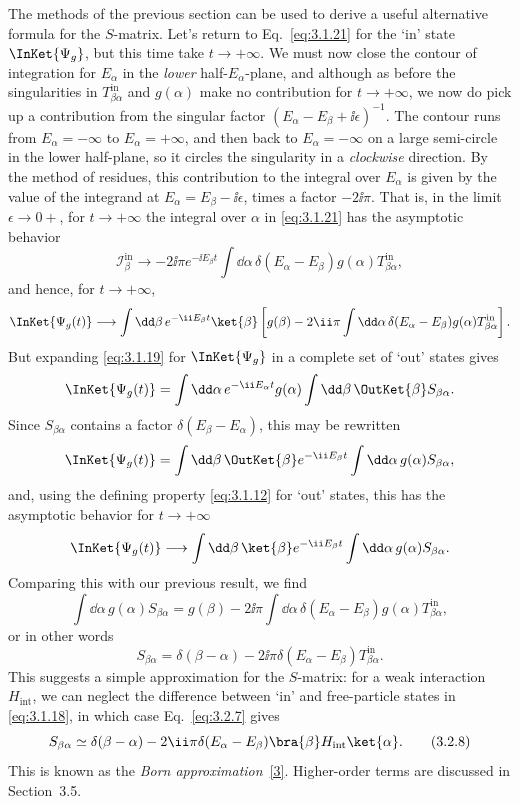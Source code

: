 The methods of the previous section can be used to derive a useful alternative
formula for the $S$-matrix. Let's return to Eq.~\eqref{eq:3.1.21} for the `in' state
$\InKet{\Psi_g}$, but this time take $t\to+\infty$. We must now
close the contour of integration for $E_\alpha$ in the \textit{lower}
half-$E_\alpha$-plane, and although as before the singularities in
$T^{\mathrm{in}}_{\beta\alpha}$ and $g(\alpha)$ make no contribution for
$t\to+\infty$, we now do pick up a contribution from the singular factor
$(E_\alpha-E_\beta+\ii\epsilon)^{-1}$. The contour runs from
$E_\alpha=-\infty$ to $E_\alpha=+\infty$, and then back to
$E_\alpha=-\infty$ on a large semi-circle in the lower half-plane, so it
circles the singularity in a \textit{clockwise} direction. By the method of
residues, this contribution to the integral over $E_\alpha$ is given by the
value of the integrand at $E_\alpha=E_\beta-\ii\epsilon$, times a factor
$-2\ii\pi$. That is, in the limit $\epsilon\to0+$, for $t\to+\infty$ the
integral over $\alpha$ in \eqref{eq:3.1.21} has the asymptotic behavior
\[
\mathcal I^{\mathrm{in}}_\beta\longrightarrow
-2\ii\pi e^{-\ii E_\beta t}
\int \dd\alpha\,\delta(E_\alpha-E_\beta)g(\alpha)
T^{\mathrm{in}}_{\beta\alpha},
\]
and hence, for $t\to+\infty$,
\[
\InKet{\Psi_g(t)}\longrightarrow
\int \dd\beta\,e^{-\ii E_\beta t}\ket{\beta}
\left[g(\beta)-2\ii\pi\int \dd\alpha\,
\delta(E_\alpha-E_\beta)g(\alpha)
T^{\mathrm{in}}_{\beta\alpha}\right].
\]
But expanding \eqref{eq:3.1.19} for $\InKet{\Psi_g}$ in a complete set of
`out' states gives
\[
\InKet{\Psi_g(t)}
=\int \dd\alpha\,e^{-\ii E_\alpha t}g(\alpha)
\int \dd\beta\,\OutKet{\beta}S_{\beta\alpha}.
\]
Since $S_{\beta\alpha}$ contains a factor $\delta(E_\beta-E_\alpha)$, this
may be rewritten
\[
\InKet{\Psi_g(t)}
=\int \dd\beta\,\OutKet{\beta}e^{-\ii E_\beta t}
\int \dd\alpha\,g(\alpha)S_{\beta\alpha},
\]
and, using the defining property \eqref{eq:3.1.12} for `out' states, this has the
asymptotic behavior for $t\to+\infty$
\[
\InKet{\Psi_g(t)}\longrightarrow
\int \dd\beta\,\ket{\beta}e^{-\ii E_\beta t}
\int \dd\alpha\,g(\alpha)S_{\beta\alpha}.
\]
Comparing this with our previous result, we find
\[
\int \dd\alpha\,g(\alpha)S_{\beta\alpha}
=g(\beta)-2\ii\pi\int \dd\alpha\,
\delta(E_\alpha-E_\beta)g(\alpha)T^{\mathrm{in}}_{\beta\alpha},
\]
or in other words
\begin{equation}
S_{\beta\alpha}=\delta(\beta-\alpha)
-2\ii\pi\delta(E_\alpha-E_\beta)T^{\mathrm{in}}_{\beta\alpha}.
\tag{3.2.7}\label{eq:3.2.7}
\end{equation}
This suggests a simple approximation for the $S$-matrix: for a weak
interaction $H_{\mathrm{int}}$, we can neglect the difference between `in'
and free-particle states in \eqref{eq:3.1.18}, in which case Eq.~\eqref{eq:3.2.7} gives
\begin{equation}
S_{\beta\alpha}\simeq\delta(\beta-\alpha)
-2\ii\pi\delta(E_\alpha-E_\beta)
\bra{\beta}H_{\mathrm{int}}\ket{\alpha}.
\tag{3.2.8}\label{eq:3.2.8}
\end{equation}
This is known as the \textit{Born approximation}~\hyperref[ref:3.3]{[3]}. Higher-order terms are
discussed in Section~3.5.

